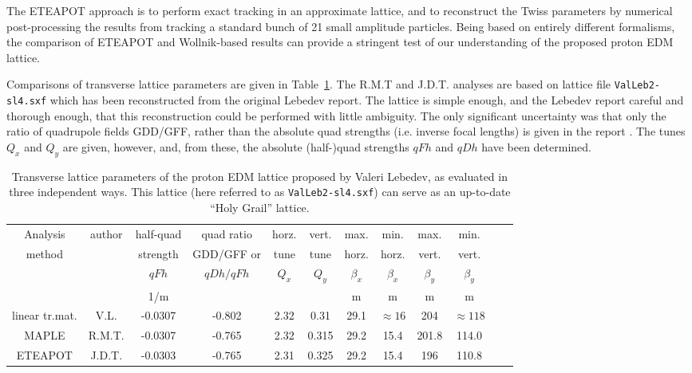 \documentclass[12]{article}
\begin{document}
The ETEAPOT approach is to perform exact tracking in an approximate lattice, 
and to reconstruct the Twiss parameters by numerical post-processing the 
results from tracking a standard bunch of 21 small amplitude particles.
Being based on entirely different formalisms, the comparison of ETEAPOT and
Wollnik-based results can provide a stringent test of our understanding of 
the proposed proton EDM lattice.

Comparisons of transverse lattice parameters are given in Table~\ref{tbl:TransverseParams}.
The R.M.T and J.D.T. analyses are based on lattice file {\tt ValLeb2-sl4.sxf} which
has been reconstructed from the original Lebedev\cite{ValLeb2} report. The lattice
is simple enough, and the Lebedev report careful and thorough enough, that this
reconstruction could be performed with little ambiguity. The only significant
uncertainty was that only the ratio of quadrupole fields GDD/GFF, rather than
the absolute quad strengths (i.e. inverse focal lengths) is given in the report 
\cite{ValLeb2}. The tunes $Q_x$ and $Q_y$ are given, however, and, from these, 
the absolute (half-)quad strengths $qFh$ and $qDh$ have been determined.
%
\begin{table}[h]
\caption{\label{tbl:TransverseParams}Transverse lattice parameters of the proton EDM 
lattice proposed by Valeri Lebedev\cite {Benchmark-I}, as evaluated in three independent 
ways. This lattice (here referred to as {\tt ValLeb2-sl4.sxf}) can serve as an
up-to-date ``Holy Grail'' lattice. 
} 
\medskip
\centering
\begin{tabular}{|c|c|c|c|c|c|c|c|c|c|c|c|}           \hline
Analysis   & author    & half-quad & quad ratio & horz. & vert. &     max.     &     min.      &     max.      &     min.      \\
 method    &           &  strength & GDD/GFF or & tune  & tune  &    horz.     &     horz.     &    vert.      &    vert.      \\ 
           &           &  $qFh$    & $qDh/qFh$  & $Q_x$ & $Q_y$ &   $\beta_x$   &   $\beta_x$   &   $\beta_y$   & $\beta_y$     \\ \hline
           &           &   1/m     &            &       &       &       m       &      m        &      m        &      m        \\ \hline
linear tr.mat. &  V.L. & -0.0307   &  -0.802    & 2.32  & 0.31  &      29.1     & $\approx16$   &    204        &  $\approx118$ \\     
MAPLE      & R.M.T.    & -0.0307   &  -0.765    & 2.32  & 0.315 &      29.2     &    15.4       &   201.8       &   114.0       \\ 
ETEAPOT    & J.D.T.    & -0.0303   &  -0.765    & 2.31  & 0.325 &      29.2     &    15.4       &    196        &   110.8       \\  
\hline
\end{tabular}
\end{table}
%
\end{document}
